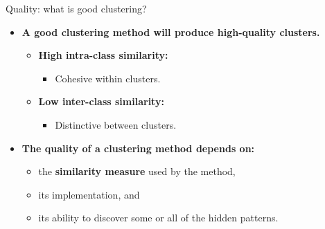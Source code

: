 \documentclass[aspectratio=169,t,xcolor=dvipsnames]{beamer}
\begin{document}
  {
    \begin{frame}{Quality: what is good clustering?}
        \begin{itemize}
          \item \textbf{A good clustering method will produce high-quality clusters.}
          \begin{itemize}
            \item \textbf{\color{airforceblue}High intra-class similarity:}
            \begin{itemize}
              \item Cohesive within clusters.
            \end{itemize}
            \item \textbf{\color{airforceblue}Low inter-class similarity:}
            \begin{itemize}
              \item Distinctive between clusters.
            \end{itemize}
          \end{itemize}
          \item \textbf{The {\color{airforceblue}quality} of a clustering method depends on:}
          \begin{itemize}
            \item the \textbf{\color{airforceblue}similarity measure} used by the method,
            \item its implementation, and
            \item its ability to discover some or all of the hidden patterns.
          \end{itemize}
        \end{itemize}
    \end{frame}
  }
\end{document}
